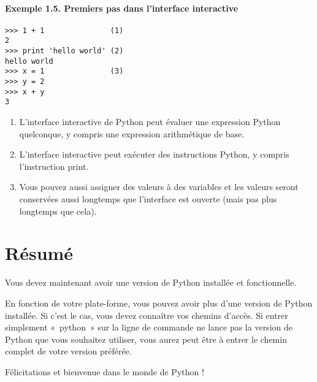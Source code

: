 \paragraph*{Exemple 1.5. Premiers pas dans l'interface interactive}

\begin{lstlisting}
>>> 1 + 1               (1)
2
>>> print 'hello world' (2)
hello world
>>> x = 1               (3)
>>> y = 2
>>> x + y
3
\end{lstlisting}

\begin{enumerate}
    \item{L'interface interactive de Python peut évaluer une expression Python quelconque, y compris une expression arithmétique de base.}
    \item{L'interface interactive peut exécuter des instructions Python, y compris l'instruction print.}
    \item{Vous pouvez aussi assigner des valeurs à des variables et les valeurs seront conservées aussi longtemps que l'interface est ouverte (mais pas plus longtemps que cela).}
\end{enumerate}

\section{Résumé}\label{Résumé}

Vous devez maintenant avoir une version de Python installée et fonctionnelle.

\medskip
En fonction de votre plate-forme, vous pouvez avoir plus d'une version de Python installée. Si c'est le cas, vous devez connaître vos chemins d'accès. Si  entrer simplement  «~python~»  sur la ligne de commande ne lance pas la version de Python que vous souhaitez utiliser, vous aurez peut être à entrer le chemin complet  de votre version préférée.

\medskip
Félicitations et bienvenue dans le monde de Python !

